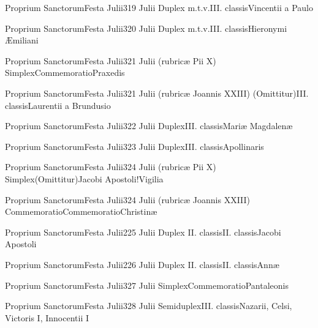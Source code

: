 \documentclass[psalterium-feriale.tex]{subfiles}
\begin{document}
	{Proprium Sanctorum}{Festa Julii}{3}{19 Julii}
	{Duplex m.t.v.}{III. classis}{Vincentii a Paulo}
	{}
	{}

	{Proprium Sanctorum}{Festa Julii}{3}{20 Julii}
	{Duplex m.t.v.}{III. classis}{Hieronymi Æmiliani}
	{}
	{}

	{Proprium Sanctorum}{Festa Julii}{3}{21 Julii (rubricæ Pii X)}
	{Simplex}{Commemoratio}{Praxedis}
	{}
	{}

	{Proprium Sanctorum}{Festa Julii}{3}{21 Julii (rubricæ Joannis XXIII)}
	{(Omittitur)}{III. classis}{Laurentii a Brundusio}
	{}
	{}

	{Proprium Sanctorum}{Festa Julii}{3}{22 Julii}
	{Duplex}{III. classis}{Mariæ Magdalenæ}
	{}
	{}

	{Proprium Sanctorum}{Festa Julii}{3}{23 Julii}
	{Duplex}{III. classis}{Apollinaris}
	{}
	{}

	{Proprium Sanctorum}{Festa Julii}{3}{24 Julii (rubricæ Pii X)}
	{Simplex}{(Omittitur)}{Jacobi Apostoli!Vigilia}
	{}
	{}
\invitferia

	{Proprium Sanctorum}{Festa Julii}{3}{24 Julii (rubricæ Joannis XXIII)}
	{Commemoratio}{Commemoratio}{Christinæ}
	{}
	{}
\invitferia

	{Proprium Sanctorum}{Festa Julii}{2}{25 Julii}
	{Duplex II. classis}{II. classis}{Jacobi Apostoli}
	{}
	{}
\psalmodiapropria

	{Proprium Sanctorum}{Festa Julii}{2}{26 Julii}
	{Duplex II. classis}{II. classis}{Annæ}
	{}
	{}
\psalmodiapropria

	{Proprium Sanctorum}{Festa Julii}{3}{27 Julii}
	{Simplex}{Commemoratio}{Pantaleonis}
	{}
	{}

	{Proprium Sanctorum}{Festa Julii}{3}{28 Julii}
	{Semiduplex}{III. classis}{Nazarii, Celsi, Victoris I, Innocentii I}
	{}
	{}
\end{document}
